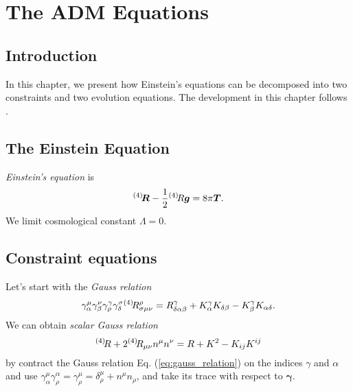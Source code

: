 
\chapter{The ADM Equations} %

\label{Chapter2} %



\section{Introduction}

In this chapter, we present how Einstein's equations can be decomposed into two constraints and two evolution equations. The development in this chapter follows \parencite{gourgoulhon20123+}.

\section{The Einstein Equation}
\emph{Einstein's equation} is
\begin{equation}
	\label{eq:einstein_equation}
	{}^{(4)}\hspace{-0.2em} \bm{R} - \frac{1}{2}{}^{(4)}\hspace{-0.2em} R\bm{g} = 8 \pi \bm{T}.
\end{equation}
We limit cosmological constant $\Lambda = 0$.

\section{Constraint equations}

Let's start with the \emph{Gauss relation}
\begin{equation}
	\label{eq:gauss_relation}
	\gamma^\mu _\alpha \gamma ^\nu_\beta \gamma^\gamma_\rho \gamma^\sigma_\delta {}^{(4)}\hspace{-0.2em} R^\rho_{\sigma \mu \nu} = R^\gamma_{\delta\alpha\beta} + K^\gamma_\alpha K_{\delta\beta} - K^\gamma_\beta K_{\alpha\delta}.
\end{equation}
We can obtain \emph{scalar Gauss relation}
\begin{equation}
	\label{eq:scalar_gauss_relation}
	{}^{(4)}\hspace{-0.2em} R + 2 {}^{(4)}\hspace{-0.2em} R_{\mu\nu}n^\mu n^\nu = R + K^2 - K_{ij}K^{ij}
\end{equation}
by contract the Gauss relation Eq. (\ref{eq:gauss_relation}) on the indices $\gamma$ and $\alpha$ and use $\gamma^\mu_\alpha \gamma^\alpha_\rho = \gamma^\mu_\rho=\delta^\mu_\rho+n^\mu n_\rho$, and take its trace with respect to $\bm{\gamma}$.

